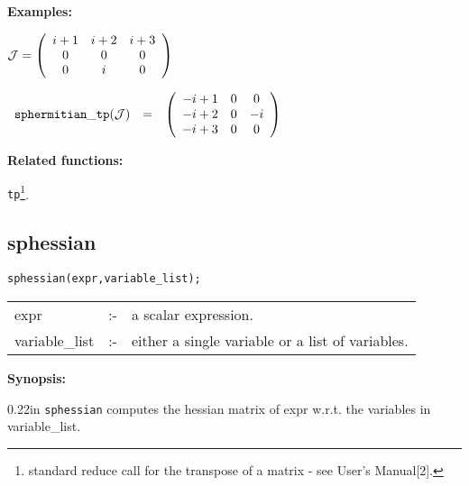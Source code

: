 {\bf Examples:}

\begin{flushleft}  
\hspace*{0.175in}
\begin{math}  
{\cal J} = \left( \begin{array}{ccc} i+1 & i+2 & i+3 \\ 0 & 0 & 0 \\ 0 &
i & 0 
\end{array} \right)
\end{math}  
\end{flushleft}

\vspace*{0.1in}

\begin{flushleft}  
\hspace*{0.1in}
\begin{math}        
\begin{array}{ccc}
{\tt sphermitian\_tp}({\cal J}) & = & 
\left( \begin{array}{ccc} -i+1 & 0 & 0 \\ -i+2 & 0 & -i \\-i+3 & 0 & 0
\end{array} \right)
\end{array}
\end{math}  
\end{flushleft}                   

{\bf Related functions:}

\hspace*{0.175in} {\tt tp}\footnote{standard reduce call for the 
transpose of a matrix - see {\REDUCE} User's Manual[2].}.


\subsection{sphessian}

\hspace*{0.175in} {\tt sphessian(expr,variable\_list);}

\hspace*{0.1in} 
\begin{tabular}{l l l}
expr           &:-& a scalar expression. \\
variable\_list &:-& either a single variable or a list of variables.
\end{tabular}

{\bf Synopsis:} 

\begin{addtolength}{\leftskip}{0.22in}
                {\tt sphessian} computes the hessian matrix of expr w.r.t.
                the variables in variable\_list. 

\end{addtolength}


